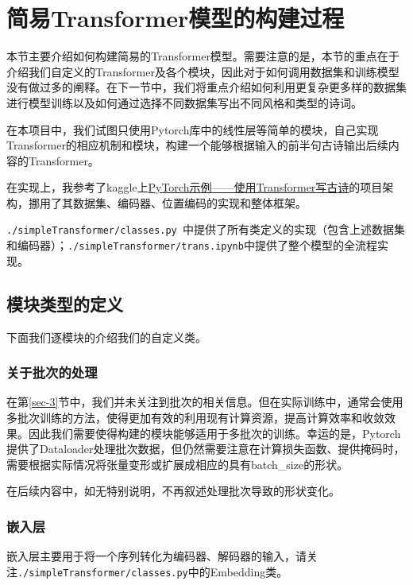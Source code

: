 \section{简易Transformer模型的构建过程}\label{sec-5}

本节主要介绍如何构建简易的Transformer模型。需要注意的是，本节的重点在于介绍我们自定义的Transformer及各个模块，因此对于如何调用数据集和训练模型没有做过多的阐释。在下一节中，我们将重点介绍如何利用更复杂更多样的数据集进行模型训练以及如何通过选择不同数据集写出不同风格和类型的诗词。

在本项目中，我们试图只使用Pytorch库中的线性层等简单的模块，自己实现Transformer的相应机制和模块，构建一个能够根据输入的前半句古诗输出后续内容的Transformer。

在实现上，我参考了kaggle上\href{https://www.kaggle.com/code/alionsss/pytorch-transformer-x/notebook}{PyTorch示例——使用Transformer写古诗}的项目架构，挪用了其数据集、编码器、位置编码的实现和整体框架。

\texttt{./simpleTransformer/classes.py }中提供了所有类定义的实现（包含上述数据集和编码器）；\texttt{./simpleTransformer/trans.ipynb}中提供了整个模型的全流程实现。

\subsection{模块类型的定义}

下面我们逐模块的介绍我们的自定义类。

\subsubsection{关于批次的处理}

在第\ref{sec-3}节中，我们并未关注到批次的相关信息。但在实际训练中，通常会使用多批次训练的方法，使得更加有效的利用现有计算资源，提高计算效率和收敛效果。因此我们需要使得构建的模块能够适用于多批次的训练。幸运的是，Pytorch提供了Dataloader处理批次数据，但仍然需要注意在计算损失函数、提供掩码时，需要根据实际情况将张量变形或扩展成相应的具有batch\_size的形状。

在后续内容中，如无特别说明，不再叙述处理批次导致的形状变化。

\subsubsection{嵌入层}

嵌入层主要用于将一个序列转化为编码器、解码器的输入，请关注\texttt{./simpleTransformer/classes.py}中的Embedding类。

